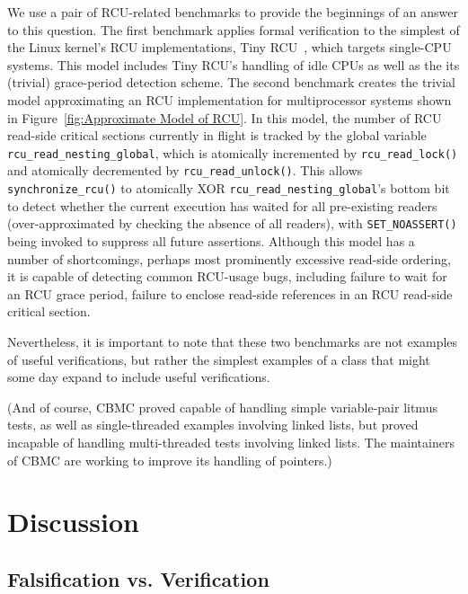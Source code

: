\documentclass[conference]{IEEEtran}
\newcommand{\co}[1]{\lstinline[breaklines=yes,breakatwhitespace=yes]{#1}}
\begin{document}
We use a pair of RCU-related benchmarks to provide the beginnings of
an answer to this question.
The first benchmark applies formal verification to the simplest of
the Linux kernel's RCU implementations, Tiny
RCU~\cite{PaulEMcKenney2009BloatwatchRCU}, which targets single-CPU
systems.
This model includes Tiny RCU's handling of idle CPUs as well as
the its (trivial) grace-period detection scheme.
The second benchmark creates the trivial model approximating an RCU
implementation for multiprocessor systems shown in
Figure~\ref{fig:Approximate Model of RCU}.
In this model, the number of RCU read-side critical sections currently
in flight is tracked by the global variable \co{rcu_read_nesting_global},
which is atomically incremented by \co{rcu_read_lock()} and atomically
decremented by \co{rcu_read_unlock()}.
This allows \co{synchronize_rcu()} to atomically XOR
\co{rcu_read_nesting_global}'s bottom bit to detect whether the current
execution has waited for all pre-existing readers (over-approximated
by checking the absence of all readers), with \co{SET_NOASSERT()}
being invoked to suppress all future assertions.
Although this model has a number of shortcomings, perhaps most prominently
excessive read-side ordering, it is capable of detecting common
RCU-usage bugs, including failure to wait for an RCU grace period,
failure to enclose read-side references in an RCU read-side critical
section.

Nevertheless, it is important to note that these two benchmarks are not
examples of useful verifications, but rather the simplest examples of
a class that might some day expand to include useful verifications.

(And of course, CBMC proved capable of handling simple variable-pair
litmus tests, as well as single-threaded examples involving linked lists,
but proved incapable of handling multi-threaded tests involving linked
lists.
The maintainers of CBMC are working to improve its handling of pointers.)


\section{Discussion}

\subsection{Falsification vs. Verification}
\end{document}

